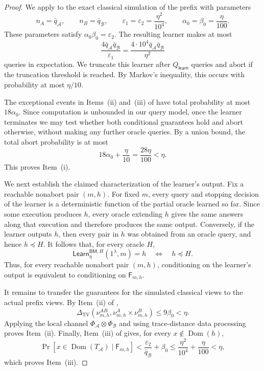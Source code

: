 \documentclass[11pt]{article}
\newcommand{\cA}{\mathcal{A}}
\newcommand{\cB}{\mathcal{B}}
\newcommand{\Dom}{\operatorname{Dom}}
\newcommand{\Learn}{\mathsf{Learn}}
\begin{document}
\begin{proof}
We apply  to the exact classical simulation of
the prefix with parameters
\[
  n_A=\bar q_{\cA},
  \qquad
  n_B=\bar q_{\cB},
  \qquad
  \varepsilon_1=\varepsilon_2=\frac{\eta^2}{10^4},
  \qquad
  \alpha_0=\beta_0=\frac{\eta}{100}.
\]
These parameters satisfy $\alpha_0\beta_0=\varepsilon_2$.  The resulting
learner makes at most
\[
  \frac{4\bar q_{\cA}\bar q_{\cB}}{\varepsilon_1}
  =
  \frac{4\cdot10^4\bar q_{\cA}\bar q_{\cB}}{\eta^2}
\]
queries in expectation.  We truncate this learner after
$Q_{\mathsf{learn}}$ queries and abort if the truncation threshold is
reached.  By Markov's inequality, this occurs with probability at most
$\eta/10$.

The exceptional events in Items~\textup{(ii)} and~\textup{(iii)} of
 have total probability at most
$18\alpha_0$.  Since computation is unbounded in our query model, once the
learner terminates we may test whether both conditional guarantees hold and
abort otherwise, without making any further oracle queries.  By a union
bound, the total abort probability is at most
\[
  18\alpha_0+\frac{\eta}{10}
  =\frac{28\eta}{100}<\eta.
\]
This proves Item~\textup{(i)}.

We next establish the claimed characterization of the learner's output.  Fix
a reachable nonabort pair $(m,h)$.  For fixed $m$, every query and stopping
decision of the learner is a deterministic function of the partial oracle
learned so far.  Since some execution produces $h$, every oracle extending
$h$ gives the same answers along that execution and therefore produces the
same output.  Conversely, if the learner outputs $h$, then every pair in $h$
was obtained from an oracle query, and hence $h\preceq H$.  It follows that,
for every oracle $H$,
\[
  \Learn^{\mathsf{BM},H}_\eta(1^\lambda,m)=h
  \quad\Longleftrightarrow\quad
  h\preceq H.
\]
Thus, for every reachable nonabort pair $(m,h)$, conditioning on the learner's
output is equivalent to conditioning on $\mathsf F_{m,h}$.

It remains to transfer the guarantees for the simulated classical views to
the actual prefix views.  By Item~\textup{(ii)} of
,
\[
  \Delta_{\mathrm{TV}}\!\left(
    \nu^{AB}_{m,h},
    \nu^A_{m,h}\times\nu^B_{m,h}
  \right)
  \le 9\beta_0<\eta.
\]
Applying the local channel $\Phi_{\cA}\otimes\Phi_{\cB}$ and using
trace-distance data processing~\cite[Chapter~3]{Watrous18} proves
Item~\textup{(ii)}.  Finally, Item~\textup{(iii)} of
 gives, for every $x\notin\Dom(h)$,
\[
  \Pr[x\in\Dom(T_{\cA})\mid\mathsf F_{m,h}]
  <
  \frac{\varepsilon_2}{\bar q_{\cB}}+\beta_0
  \le
  \frac{\eta^2}{10^4}+\frac{\eta}{100}
  <\eta,
\]
which proves Item~\textup{(iii)}.
\end{proof}
\end{document}
